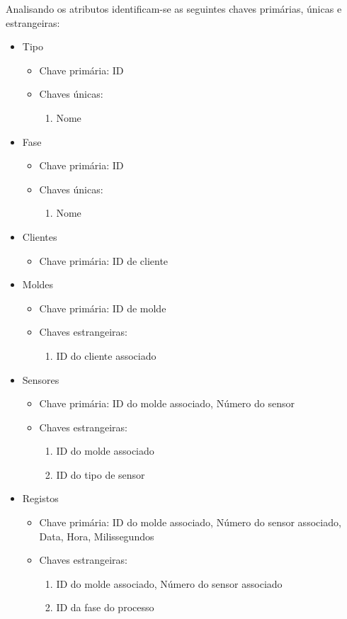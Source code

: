 \documentclass[11pt,twoside,a4paper]{report}
\begin{document}
\newpage
Analisando os atributos identificam-se as seguintes chaves primárias, únicas e estrangeiras:
\begin{itemize}[noitemsep]
	\item Tipo
	\begin{itemize}[noitemsep]
		\item Chave primária: ID
		\item Chaves únicas:
		\begin{enumerate}
			\item Nome
		\end{enumerate}
	\end{itemize}
	\item Fase
	\begin{itemize}[noitemsep]
		\item Chave primária: ID
		\item Chaves únicas:
		\begin{enumerate}
			\item Nome
		\end{enumerate}
	\end{itemize}
	\item Clientes
	\begin{itemize}[noitemsep]
		\item Chave primária: ID de cliente
	\end{itemize}
	\item Moldes
	\begin{itemize}[noitemsep]
		\item Chave primária: ID de molde
		\item Chaves estrangeiras:
		\begin{enumerate}
			\item ID do cliente associado
		\end{enumerate}
	\end{itemize}
	\item Sensores
	\begin{itemize}[noitemsep]
		\item Chave primária: ID do molde associado, Número do sensor
		\item Chaves estrangeiras:
		\begin{enumerate}
			\item ID do molde associado
			\item ID do tipo de sensor
		\end{enumerate}
	\end{itemize}
	\item Registos
	\begin{itemize}[noitemsep]
		\item Chave primária: ID do molde associado, Número do sensor associado, Data, Hora, Milissegundos
		\item Chaves estrangeiras:
		\begin{enumerate}
			\item ID do molde associado, Número do sensor associado
			\item ID da fase do processo
		\end{enumerate}
	\end{itemize}
\end{itemize}
\end{document}
